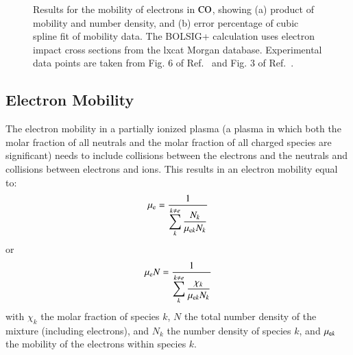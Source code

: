 \documentclass{warpdoc}
\newcommand{\mfd}{\displaystyle}
\begin{document}
\begin{figure}
\centering
{}
\caption{Results for the mobility of electrons in ${\rm CO}$, showing (a) product of mobility and number density, and (b) error percentage of cubic spline fit of  mobility data. The BOLSIG+ calculation uses electron impact cross sections from the lxcat Morgan database. Experimental data points are taken from Fig. 6 of Ref.\ \cite{jop:1987:nakamura} and Fig. 3 of Ref.\ \cite{jop:1984:roznerski}.}
\label{fig:mobility_CO}
\end{figure}

\subsection{Electron Mobility}

The electron mobility in a partially ionized plasma (a plasma in which both the molar fraction of all neutrals and the molar fraction of all charged species are significant) needs to include collisions between the electrons and the neutrals and collisions between electrons and ions. This results in an electron mobility equal to:
%
\begin{equation}
\mu_{\rm e}=\frac{1}{\mfd \sum_k^{k\ne e} \frac{N_k}{\mu_{{\rm e}k}N_k}}
\end{equation}
%
or
%
\begin{equation}
\mu_{\rm e} N=\frac{1}{\mfd \sum_k^{k\ne e} \frac{\chi_k}{\mu_{{\rm e}k}N_k}}
\end{equation}
%
with $\chi_k$ the molar fraction of species $k$, $N$ the total number density of the mixture (including electrons), and $N_k$ the number density of species $k$, and $\mu_{{\rm e}k}$ the mobility of the electrons within species $k$. 
\end{document}
